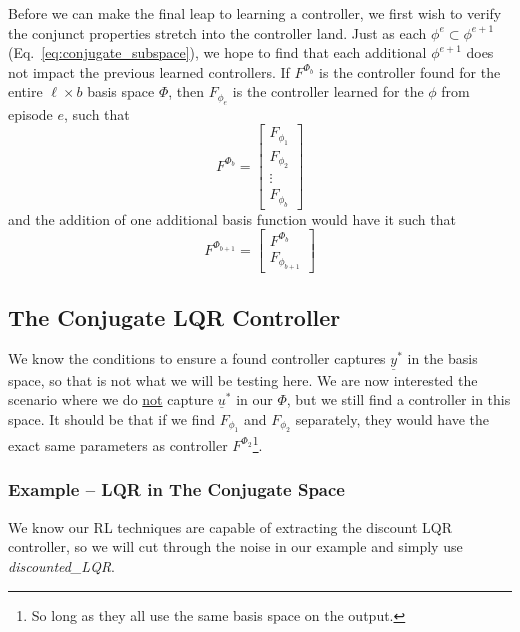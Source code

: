 Before we can make the final leap to learning a controller, we first wish to verify the conjunct properties stretch into the controller land. Just as each $\phi^{e} \subset \phi^{e+1}$ (Eq.~\ref{eq:conjugate_subspace}), we hope to find that each additional $\phi^{e+1}$ does not impact the previous learned controllers. If $F^{\Phi_b}$ is the controller found for the entire $\ell \times b$ basis space $\Phi$, then $F_{\phi_e}$ is the controller learned for the $\phi$ from episode $e$, such that
\begin{equation}
    F^{\Phi_b} = \begin{bmatrix}
        F_{\phi_1} \\ F_{\phi_2} \\ \vdots \\ F_{\phi_b}
    \end{bmatrix}
\end{equation}
and the addition of one additional basis function would have it such that
\begin{equation}
    F^{\Phi_{b+1}} = \begin{bmatrix}
        F^{\Phi_b} \\ F_{\phi_{b+1}}
    \end{bmatrix}
\end{equation}

\FloatBarrier\subsection{The Conjugate LQR Controller}
We know the conditions to ensure a found controller captures $\underline{y}^\ast$ in the basis space, so that is not what we will be testing here. We are now interested the scenario where we do \underline{not} capture $\underline{u}^\ast$ in our $\Phi$, but we still find a controller in this space. It should be that if we find $F_{\phi_1}$ and $F_{\phi_2}$ separately, they would have the exact same parameters as controller $F^{\Phi_2}$\footnote{So long as they all use the same basis space on the output.}.

\FloatBarrier\subsubsection{Example -- LQR in The Conjugate Space}
We know our RL techniques are capable of extracting the discount LQR controller, so we will cut through the noise in our example and simply use \textit{discounted\_LQR}.

